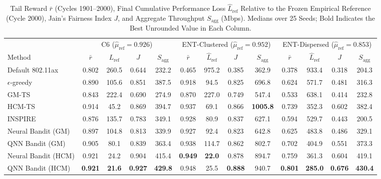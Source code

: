 \begin{table}[!t]
\centering
\caption{Tail Reward $\bar r$ (Cycles 1901--2000), Final Cumulative Performance Loss $\hat L_{\mathrm{ref}}$ Relative to the Frozen Empirical Reference (Cycle 2000), Jain's Fairness Index $J$, and Aggregate Throughput $S_{\mathrm{agg}}$ (Mbps). Medians over 25 Seeds; Bold Indicates the Best Unrounded Value in Each Column.}
\label{tab:final}
\small
\setlength{\tabcolsep}{4.2pt}
\begin{tabular}{l|cccc|cccc|cccc}
\hline
& \multicolumn{4}{c|}{C6 ($\hat\mu_{\mathrm{ref}}=0.926$)} & \multicolumn{4}{c|}{ENT-Clustered ($\hat\mu_{\mathrm{ref}}=0.952$)} & \multicolumn{4}{c}{ENT-Dispersed ($\hat\mu_{\mathrm{ref}}=0.853$)} \\
Method & $\bar r$ & $\hat L_{\mathrm{ref}}$ & $J$ & $S_{\mathrm{agg}}$ & $\bar r$ & $\hat L_{\mathrm{ref}}$ & $J$ & $S_{\mathrm{agg}}$ & $\bar r$ & $\hat L_{\mathrm{ref}}$ & $J$ & $S_{\mathrm{agg}}$ \\
\hline
Default 802.11ax & 0.802 & 260.5 & 0.644 & 232.2 & 0.465 & 975.2 & 0.385 & 362.9 & 0.378 & 933.4 & 0.318 & 204.3 \\
$\epsilon$-greedy & 0.890 & 105.6 & 0.851 & 387.5 & 0.918 & 94.5 & 0.825 & 696.8 & 0.624 & 571.7 & 0.481 & 316.3 \\
GM-TS \cite{bardou2021improving} & 0.843 & 222.4 & 0.690 & 274.9 & 0.870 & 227.0 & 0.749 & 547.4 & 0.533 & 638.1 & 0.414 & 232.8 \\
HCM-TS \cite{bardou2023mitigating} & 0.914 & 45.2 & 0.869 & 394.7 & 0.937 & 69.1 & 0.866 & \textbf{1005.8} & 0.739 & 352.3 & 0.602 & 382.4 \\
INSPIRE \cite{bardou2022inspire} & 0.876 & 135.7 & 0.783 & 349.1 & 0.928 & 80.9 & 0.837 & 627.1 & 0.594 & 529.7 & 0.443 & 200.5 \\
\hline
Neural Bandit (GM) & 0.897 & 104.8 & 0.813 & 339.9 & 0.927 & 92.4 & 0.823 & 642.8 & 0.625 & 483.8 & 0.486 & 329.1 \\
QNN Bandit (GM) & 0.905 & 80.1 & 0.839 & 363.4 & 0.938 & 114.7 & 0.862 & 802.7 & 0.702 & 404.9 & 0.551 & 373.3 \\
Neural Bandit (HCM) & 0.921 & 24.2 & 0.904 & 415.4 & \textbf{0.949} & \textbf{22.0} & 0.878 & 894.7 & 0.759 & 361.3 & 0.604 & 419.1 \\
QNN Bandit (HCM) & \textbf{0.921} & \textbf{21.6} & \textbf{0.927} & \textbf{429.8} & 0.948 & 25.5 & \textbf{0.888} & 940.7 & \textbf{0.801} & \textbf{285.0} & \textbf{0.676} & \textbf{430.4} \\
\hline
\end{tabular}
\end{table}

